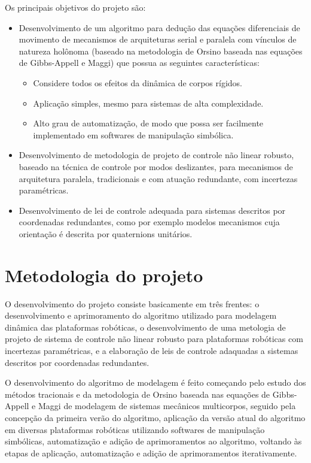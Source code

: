 \documentclass[a4paper,11pt,brazil,fleqn]{article}
\begin{document}
Os principais objetivos do projeto s\~ao:
\begin{itemize}
\item Desenvolvimento de um algoritmo para dedu\c{c}\~ao das equa\c{c}\~oes diferenciais de movimento de mecanismos de arquiteturas serial e paralela com v\'inculos de natureza hol\^onoma (baseado na metodologia de Orsino baseada nas equa\c{c}\~oes de Gibbs-Appell e Maggi) que possua as seguintes caracter\'isticas:
\begin{itemize}
\item Considere todos os efeitos da din\^amica de corpos r\'igidos.
\item Aplica\c{c}\~ao simples, mesmo para sistemas de alta complexidade.
\item Alto grau de automatiza\c{c}\~ao, de modo que possa ser facilmente implementado em softwares de manipula\c{c}\~ao simb\'olica.
\end{itemize}
\item Desenvolvimento de metodologia de projeto de controle n\~ao linear robusto, baseado na t\'ecnica de controle por modos deslizantes, para mecanismos de arquitetura paralela, tradicionais e com atua\c{c}\~ao redundante, com incertezas param\'etricas.
\item Desenvolvimento de lei de controle adequada para sistemas descritos por coordenadas redundantes, como por exemplo modelos mecanismos cuja orienta\c{c}\~ao \'e descrita por quaternions unit\'arios.
\end{itemize}

 

\section{Metodologia do projeto}\label{S03}

O desenvolvimento do projeto consiste basicamente em tr\^es frentes: o desenvolvimento e aprimoramento do algoritmo utilizado para modelagem din\^amica das plataformas rob\'oticas, o desenvolvimento de uma metologia de projeto de sistema de controle n\~ao linear robusto para plataformas rob\'oticas com incertezas param\'etricas, e a elabora\c{c}\~ao de leis de controle adaquadas a sistemas descritos por coordenadas redundantes.

O desenvolvimento do algoritmo de modelagem \'e feito come\c{c}ando pelo estudo dos m\'etodos tracionais e da metodologia de Orsino baseada nas equa\c{c}\~oes de Gibbs-Appell e Maggi de modelagem de sistemas mec\^anicos multicorpos, seguido pela concep\c{c}\~ao da primeira ver\~ao do algoritmo, aplica\c{c}\~ao da vers\~ao atual do algoritmo em diversas plataformas rob\'oticas utilizando softwares de manipula\c{c}\~ao simb\'olicas, automatiza\c{c}\~ao e adi\c{c}\~ao de aprimoramentos ao algoritmo, voltando \`as etapas de aplica\c{c}\~ao, automatiza\c{c}\~ao e adi\c{c}\~ao de aprimoramentos iterativamente.
\end{document}
